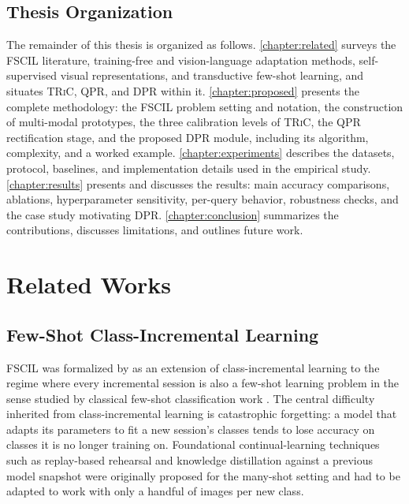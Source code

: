 \documentclass{iutbscthesis}
\begin{document}
\section{Thesis Organization}

The remainder of this thesis is organized as follows. \autoref{chapter:related} surveys the FSCIL literature, training-free and vision-language adaptation methods, self-supervised visual representations, and transductive few-shot learning, and situates \textsc{TRiC}, QPR, and DPR within it. \autoref{chapter:proposed} presents the complete methodology: the FSCIL problem setting and notation, the construction of multi-modal prototypes, the three calibration levels of \textsc{TRiC}, the QPR rectification stage, and the proposed DPR module, including its algorithm, complexity, and a worked example. \autoref{chapter:experiments} describes the datasets, protocol, baselines, and implementation details used in the empirical study. \autoref{chapter:results} presents and discusses the results: main accuracy comparisons, ablations, hyperparameter sensitivity, per-query behavior, robustness checks, and the case study motivating DPR. \autoref{chapter:conclusion} summarizes the contributions, discusses limitations, and outlines future work.


\chapter{Related Works}
\label{chapter:related}

\section{Few-Shot Class-Incremental Learning}

FSCIL was formalized by \textcite{tao2020fewshot} as an extension of class-incremental learning \autocite{parisi2019continual, delange2021continual} to the regime where every incremental session is also a few-shot learning problem in the sense studied by classical few-shot classification work \autocite{vinyals2016matching, snell2017prototypical, finn2017modelagnostic, chen2019closer}. The central difficulty inherited from class-incremental learning is catastrophic forgetting: a model that adapts its parameters to fit a new session's classes tends to lose accuracy on classes it is no longer training on. Foundational continual-learning techniques such as replay-based rehearsal and knowledge distillation against a previous model snapshot \autocite{rebuffi2017icarl, li2016learning} were originally proposed for the many-shot setting and had to be adapted to work with only a handful of images per new class.
\end{document}
